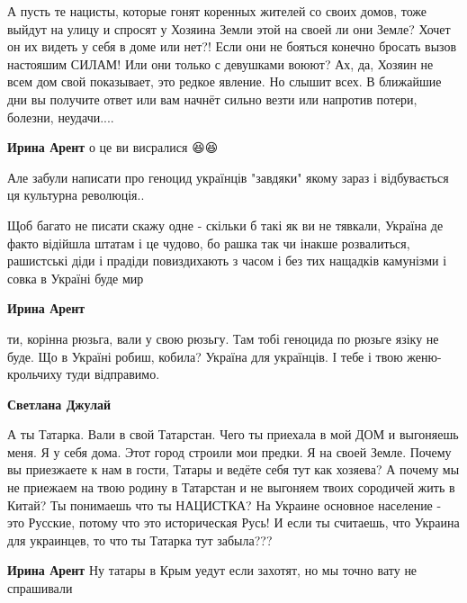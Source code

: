 \begin{itemize}
А пусть те нацисты, которые гонят коренных жителей со своих домов, тоже выйдут
на улицу и спросят у Хозяина Земли этой на своей ли они Земле? Хочет он их
видеть у себя в доме или нет?! Если они не бояться конечно бросать вызов
настояшим СИЛАМ! Или они только с девушками воюют? Ах, да, Хозяин не всем дом
свой показывает, это редкое явление. Но слышит всех. В ближайшие дни вы
получите ответ или вам начнёт сильно везти или напротив потери, болезни,
неудачи....

\begin{itemize}

\textbf{Ирина Арент} о це ви висралися 😆😆

Але забули написати про геноцид українців "завдяки" якому зараз і відбувається
ця культурна революція..

Щоб багато не писати скажу одне - скільки б такі як ви не тявкали, Україна де
факто відійшла штатам і це чудово, бо рашка так чи інакше розвалиться,
рашистські діди і прадіди повиздихають з часом і без тих нащадків камунізми і
совка в Україні буде мир



\textbf{Ирина Арент} 

ти, корінна рюзьга, вали у свою рюзьгу. Там тобі геноцида по рюзьге язіку не
буде. Що в Україні робиш, кобила? Україна для українців. І тебе і твою
женю-крольчиху туди відправимо.



\textbf{Светлана Джулай} 

А ты Татарка. Вали в свой Татарстан. Чего ты приехала в мой ДОМ и выгоняешь
меня. Я у себя дома. Этот город строили мои предки. Я на своей Земле. Почему вы
приезжаете к нам в гости, Татары и ведёте себя тут как хозяева? А почему мы не
приежаем на твою родину в Татарстан и не выгоняем твоих сородичей жить в Китай?
Ты понимаешь что ты НАЦИСТКА? На Украине основное население - это Русские,
потому что это историческая Русь! И если ты считаешь, что Украина для
украинцев, то что ты Татарка тут забыла???



\textbf{Ирина Арент} Ну татары в Крым уедут если захотят, но мы точно вату не спрашивали
\end{itemize}


\end{itemize}
